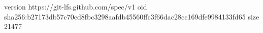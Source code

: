 version https://git-lfs.github.com/spec/v1
oid sha256:b27173db57c70cd8fbc3298aafdb45560ffc3f66dac28cc169dfe9984133fd65
size 21477
